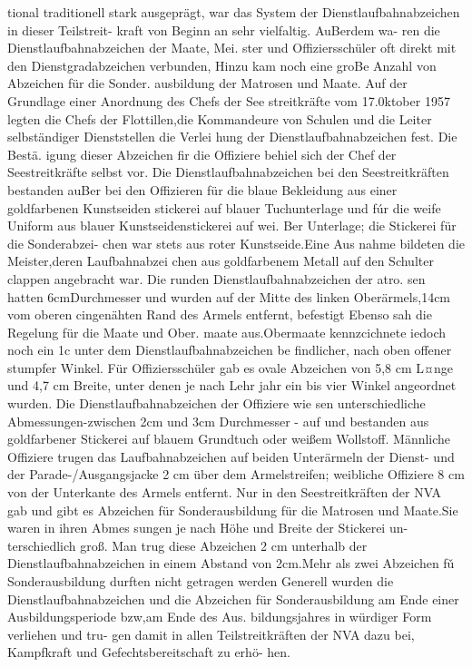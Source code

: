 tional traditionell stark ausgeprägt, war das System
der Dienstlaufbahnabzeichen in dieser Teilstreit-
kraft von Beginn an sehr vielfaltig. AuBerdem wa-
ren die Dienstlaufbahnabzeichen der Maate, Mei.
ster und Offiziersschüler oft direkt mit den
Dienstgradabzeichen verbunden, Hinzu kam noch
eine groBe Anzahl von Abzeichen für die Sonder.
ausbildung der Matrosen und Maate. Auf der
Grundlage einer Anordnung des Chefs der See
streitkräfte vom 17.0ktober 1957 legten die Chefs der Flottillen,die Kommandeure von Schulen und
die Leiter selbständiger Dienststellen die Verlei
hung der Dienstlaufbahnabzeichen fest. Die Bestä.
igung dieser Abzeichen fir die Offiziere behiel
sich der Chef der Seestreitkräfte selbst vor. Die
Dienstlaufbahnabzeichen bei den Seestreitkräften
bestanden auBer bei den Offizieren für die blaue
Bekleidung aus einer goldfarbenen Kunstseiden
stickerei auf blauer Tuchunterlage und fúr die weife
Uniform aus blauer Kunstseidenstickerei auf wei.
Ber Unterlage; die Stickerei für die Sonderabzei-
chen war stets aus roter Kunstseide.Eine Aus
nahme bildeten die Meister,deren Laufbahnabzei
chen aus goldfarbenem Metall auf den Schulter
clappen angebracht war.
Die runden Dienstlaufbahnabzeichen der atro.
sen hatten 6cmDurchmesser und wurden auf der
Mitte des linken Oberärmels,14cm vom oberen
cingenähten Rand des Armels entfernt, befestigt
Ebenso sah die Regelung für die Maate und Ober.
maate aus.Obermaate kennzcichnete iedoch noch
ein 1c unter dem Dienstlaufbahnabzeichen be
findlicher, nach oben offener stumpfer Winkel. Für
Offiziersschüler gab es ovale Abzeichen von 5,8 cm
L¤nge und 4,7 cm Breite, unter denen je nach Lehr
jahr ein bis vier Winkel angeordnet wurden.
Die Dienstlaufbahnabzeichen der Offiziere wie
sen unterschiedliche Abmessungen-zwischen
2cm und 3cm Durchmesser - auf und bestanden
aus goldfarbener Stickerei auf blauem Grundtuch
oder weißem Wollstoff. Männliche Offiziere trugen
das Laufbahnabzeichen auf beiden Unterärmeln
der Dienst- und der Parade-/Ausgangsjacke 2 cm
über dem Armelstreifen; weibliche Offiziere 8 cm
von der Unterkante des Armels entfernt.
Nur in den Seestreitkräften der NVA gab und
gibt es Abzeichen für Sonderausbildung für die
Matrosen und Maate.Sie waren in ihren Abmes
sungen je nach Höhe und Breite der Stickerei un-
terschiedlich groß. Man trug diese Abzeichen 2 cm
unterhalb der Dienstlaufbahnabzeichen in einem
Abstand von 2cm.Mehr als zwei Abzeichen fǔ
Sonderausbildung durften nicht getragen werden Generell wurden die Dienstlaufbahnabzeichen
und die Abzeichen für Sonderausbildung am Ende
einer Ausbildungsperiode bzw,am Ende des Aus.
bildungsjahres in würdiger Form verliehen und tru-
gen damit in allen Teilstreitkräften der NVA dazu
bei, Kampfkraft und Gefechtsbereitschaft zu erhö-
hen.